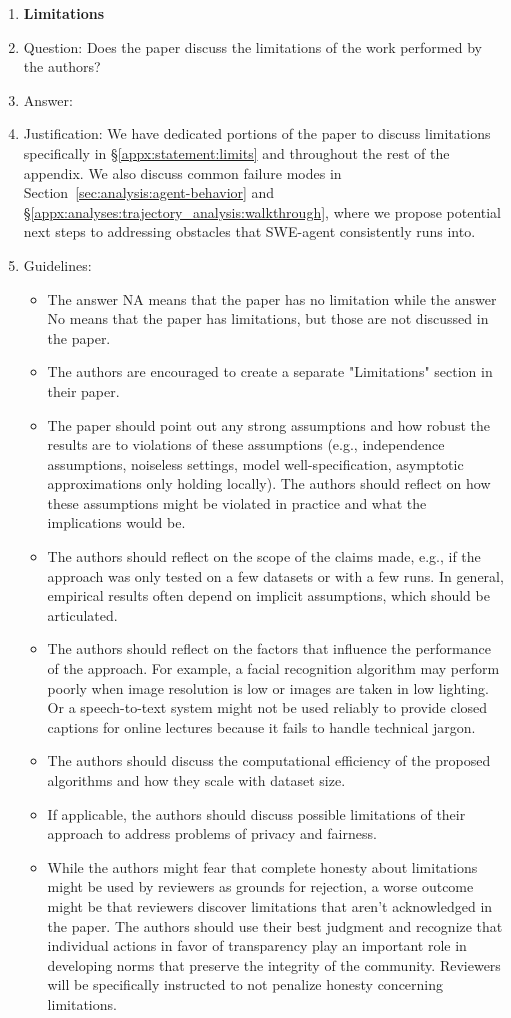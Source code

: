 \begin{enumerate}
\item {\bf Limitations}
    \item[] Question: Does the paper discuss the limitations of the work performed by the authors?
    \item[] Answer: \answerYes{}
    \item[] Justification: We have dedicated portions of the paper to discuss limitations specifically in \S\ref{appx:statement:limits} and throughout the rest of the appendix. We also discuss common failure modes in Section~\ref{sec:analysis:agent-behavior} and \S\ref{appx:analyses:trajectory_analysis:walkthrough}, where we propose potential next steps to addressing obstacles that SWE-agent consistently runs into.
    \item[] Guidelines:
    \begin{itemize}
        \item The answer NA means that the paper has no limitation while the answer No means that the paper has limitations, but those are not discussed in the paper. 
        \item The authors are encouraged to create a separate "Limitations" section in their paper.
        \item The paper should point out any strong assumptions and how robust the results are to violations of these assumptions (e.g., independence assumptions, noiseless settings, model well-specification, asymptotic approximations only holding locally). The authors should reflect on how these assumptions might be violated in practice and what the implications would be.
        \item The authors should reflect on the scope of the claims made, e.g., if the approach was only tested on a few datasets or with a few runs. In general, empirical results often depend on implicit assumptions, which should be articulated.
        \item The authors should reflect on the factors that influence the performance of the approach. For example, a facial recognition algorithm may perform poorly when image resolution is low or images are taken in low lighting. Or a speech-to-text system might not be used reliably to provide closed captions for online lectures because it fails to handle technical jargon.
        \item The authors should discuss the computational efficiency of the proposed algorithms and how they scale with dataset size.
        \item If applicable, the authors should discuss possible limitations of their approach to address problems of privacy and fairness.
        \item While the authors might fear that complete honesty about limitations might be used by reviewers as grounds for rejection, a worse outcome might be that reviewers discover limitations that aren't acknowledged in the paper. The authors should use their best judgment and recognize that individual actions in favor of transparency play an important role in developing norms that preserve the integrity of the community. Reviewers will be specifically instructed to not penalize honesty concerning limitations.
    \end{itemize}


\end{enumerate}
